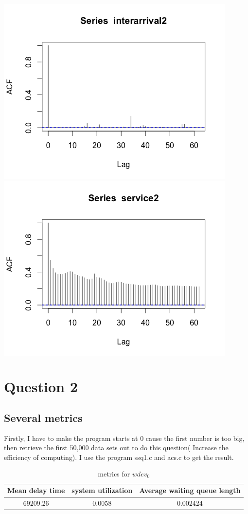 \documentclass[11pt]{article}
\begin{document}
\includegraphics[scale=0.5]{acf22inter.png}
\includegraphics[scale=0.5]{acf22service.png}


\section{Question 2}
\subsection{Several metrics}
Firstly, I have to make the program starts at 0 cause the first number is too big, then retrieve the first 50,000 data sets out to do this question( Increase the efficiency of computing). I use the program ssq1.c and acs.c to get the result.
\begin{table}[htdp]
\caption{metrics for $wdev_0$}
\begin{center}
\begin{tabular}{c|c|c}
Mean delay time & system utilization & Average waiting queue length \\
\hline
69209.26 & 0.0058 & 0.002424
\end{tabular}
\end{center}
\label{default}
\end{table}%
\end{document}
